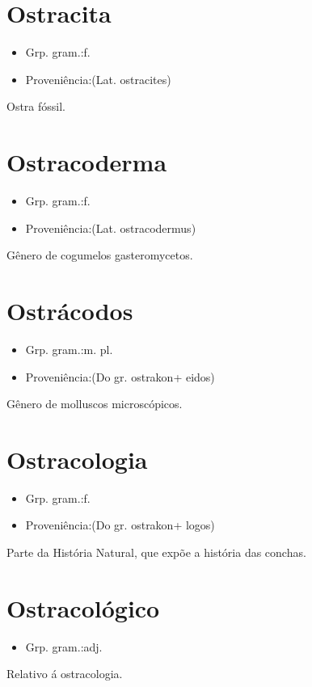 \section{Ostracita}
\begin{itemize}
\item {Grp. gram.:f.}
\end{itemize}
\begin{itemize}
\item {Proveniência:(Lat. \textunderscore ostracites\textunderscore )}
\end{itemize}
Ostra fóssil.
\section{Ostracoderma}
\begin{itemize}
\item {Grp. gram.:f.}
\end{itemize}
\begin{itemize}
\item {Proveniência:(Lat. \textunderscore ostracodermus\textunderscore )}
\end{itemize}
Gênero de cogumelos gasteromycetos.
\section{Ostrácodos}
\begin{itemize}
\item {Grp. gram.:m. pl.}
\end{itemize}
\begin{itemize}
\item {Proveniência:(Do gr. \textunderscore ostrakon\textunderscore  + \textunderscore eidos\textunderscore )}
\end{itemize}
Gênero de molluscos microscópicos.
\section{Ostracologia}
\begin{itemize}
\item {Grp. gram.:f.}
\end{itemize}
\begin{itemize}
\item {Proveniência:(Do gr. \textunderscore ostrakon\textunderscore  + \textunderscore logos\textunderscore )}
\end{itemize}
Parte da História Natural, que expõe a história das conchas.
\section{Ostracológico}
\begin{itemize}
\item {Grp. gram.:adj.}
\end{itemize}
Relativo á ostracologia.
